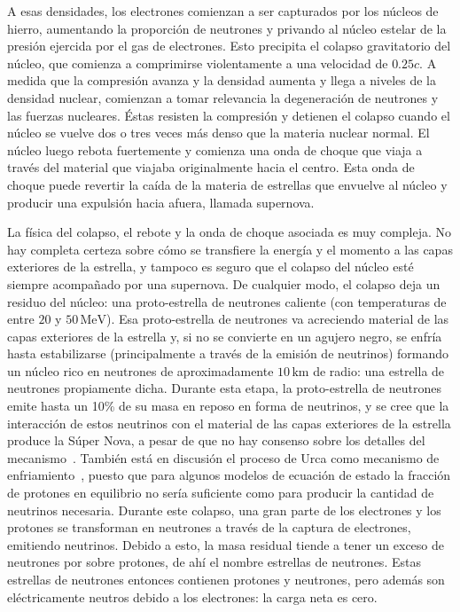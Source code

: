 A esas densidades, los electrones comienzan a ser capturados por los núcleos de hierro, aumentando la proporción de neutrones y privando al núcleo estelar de la presión ejercida por el gas de electrones.
Esto precipita el colapso gravitatorio del núcleo, que comienza a comprimirse violentamente a una velocidad de $0.25c$.
A medida que la compresión avanza y la densidad aumenta y llega a niveles de la densidad nuclear, comienzan a tomar relevancia la degeneración de neutrones y las fuerzas nucleares.
Éstas resisten la compresión y detienen el colapso cuando el núcleo se vuelve dos o tres veces más denso que la materia nuclear normal.
El núcleo luego rebota fuertemente y comienza una onda de choque que viaja a través del material que viajaba originalmente hacia el centro.
Esta onda de choque puede revertir la caída de la materia de estrellas que envuelve al núcleo y producir una expulsión hacia afuera, llamada supernova.

La física del colapso, el rebote y la onda de choque asociada es muy compleja.
No hay completa certeza sobre cómo se transfiere la energía y el momento a las capas exteriores de la estrella, y tampoco es seguro que el colapso del núcleo esté siempre acompañado por una supernova.
De cualquier modo, el colapso deja un residuo del núcleo: una proto-estrella de neutrones caliente (con temperaturas de entre $20$ y $50\,\text{MeV}$).
Esa proto-estrella de neutrones va acreciendo material de las capas exteriores de la estrella y, si no se convierte en un agujero negro, se enfría hasta estabilizarse (principalmente a través de la emisión de neutrinos) formando un núcleo rico en neutrones de aproximadamente $10\,\text{km}$ de radio: una estrella de neutrones propiamente dicha.
Durante esta etapa, la proto-estrella de neutrones emite hasta un 10\% de su masa en reposo en forma de neutrinos, y se cree que la interacción de estos neutrinos con el material de las capas exteriores de la estrella produce la Súper Nova, a pesar de que no hay consenso sobre los detalles del mecanismo~\cite{woosley_physics_2005, bethe_supernova_1990}.
También está en discusión el proceso de Urca como mecanismo de enfriamiento~\cite{piekarewicz_proton_2012, lattimer_direct_1991}, puesto que para algunos modelos de ecuación de estado la fracción de protones en equilibrio no sería suficiente como para producir la cantidad de neutrinos necesaria.
Durante este colapso, una gran parte de los electrones y los protones se transforman en neutrones a través de la captura de electrones, emitiendo neutrinos.
Debido a esto, la masa residual tiende a tener un exceso de neutrones por sobre protones, de ahí el nombre estrellas de neutrones.
Estas estrellas de neutrones entonces contienen protones y neutrones, pero además son eléctricamente neutros debido a los electrones: la carga neta es cero.

